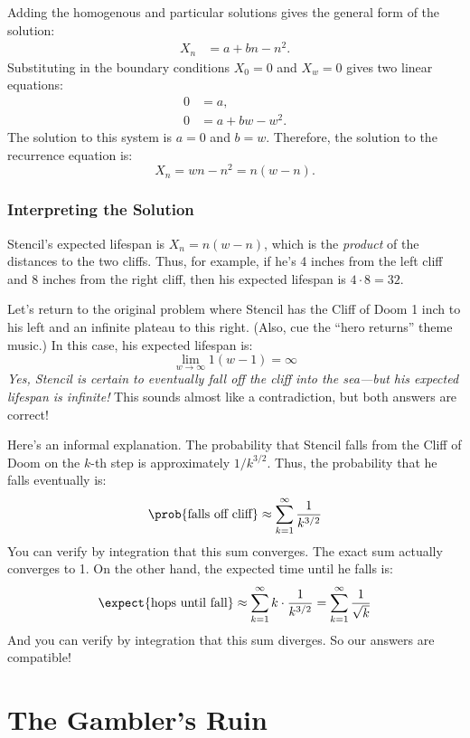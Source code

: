 Adding the homogenous and particular solutions gives the general form
of the solution:
%
\begin{align*}
    X_n & = a + b n - n^2.
\end{align*}
%
Substituting in the boundary conditions $X_0 = 0$ and $X_w = 0$ gives
two linear equations:
%
\begin{align*}
0 & = a, \\
0 & = a + b w - w^2.
\end{align*}
%
The solution to this system is $a = 0$ and $b = w$.  Therefore, the
solution to the recurrence equation is:
%
\[
X_n = w n - n^2 = n (w - n).
\]

\subsubsection{Interpreting the Solution}

Stencil's expected lifespan is $X_n = n (w - n)$, which is the
\emph{product} of the distances to the two cliffs.  Thus, for
example, if he's 4 inches from the left cliff and 8 inches from the
right cliff, then his expected lifespan is $4 \cdot 8 = 32$.

Let's return to the original problem where Stencil has the Cliff of
Doom 1 inch to his left and an infinite plateau to this right.  (Also,
cue the ``hero returns'' theme music.)  In this case, his expected
lifespan is:
%
\[
\lim_{w \to \infty} 1 (w - 1) = \infty
\]
%
\emph{Yes, Stencil is certain to eventually fall off the cliff into
the sea---but his expected lifespan is infinite!}  This sounds almost
like a contradiction, but both answers are correct!

Here's an informal explanation.  The probability that Stencil falls
from the Cliff of Doom on the $k$-th step is approximately $1 /
k^{3/2}$.  Thus, the probability that he falls eventually is:
%
\[
    \prob{\text{falls off cliff}} \approx \sum_{k=1}^{\infty} \frac{1}{k^{3/2}}
\]
%
You can verify by integration that this sum converges.  The exact sum
actually converges to 1.  On the other hand, the expected time until
he falls is:
%
\[
    \expect{\text{hops until fall}}
        \approx \sum_{k=1}^{\infty} k \cdot \frac{1}{k^{3/2}}
        = \sum_{k=1}^{\infty} \frac{1}{\sqrt{k}}
\]
%
And you can verify by integration that this sum diverges.  So our
answers are compatible!


\section{The Gambler's Ruin}

